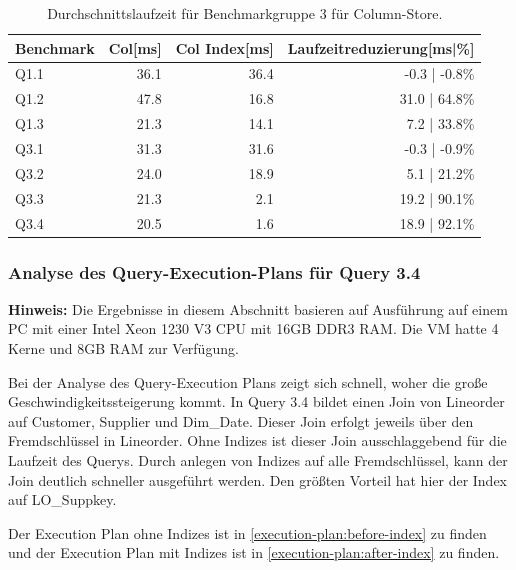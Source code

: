 \begin{table}[H]
    \centering
    \begin{tabularx}{13cm}{lrrr}
        \toprule
        Benchmark           & Col[ms]       & Col Index[ms] & Laufzeitreduzierung[ms|\%]   \\
        \toprule
        Q1.1                & 36.1          & 36.4          & -0.3 | -0.8\%                \\
        Q1.2                & 47.8          & 16.8          & 31.0 | 64.8\%                 \\
        Q1.3                & 21.3          & 14.1          & 7.2 | 33.8\%                \\
        Q3.1                & 31.3          & 31.6          & -0.3 | -0.9\%                \\
        Q3.2                & 24.0          & 18.9          & 5.1 | 21.2\%                 \\
        Q3.3                & 21.3          & 2.1           & 19.2 | 90.1\%                \\
        Q3.4                & 20.5          & 1.6           & 18.9 | 92.1\%                \\
        \bottomrule
    \end{tabularx}
\caption{Durchschnittslaufzeit für Benchmarkgruppe 3 für Column-Store.}
\end{table}

\subsubsection{Analyse des Query-Execution-Plans für Query 3.4}
\textbf{Hinweis:} Die Ergebnisse in diesem Abschnitt basieren auf Ausführung auf einem PC mit einer Intel Xeon 1230 V3 CPU mit 16GB DDR3 RAM. Die VM hatte 4 Kerne und 8GB RAM zur Verfügung.

Bei der Analyse des Query-Execution Plans zeigt sich schnell,
woher die große Geschwindigkeitssteigerung kommt.
In Query 3.4 bildet einen Join von Lineorder auf Customer,
Supplier und Dim\_Date. 
Dieser Join erfolgt jeweils über den Fremdschlüssel in Lineorder.
Ohne Indizes ist dieser Join ausschlaggebend für die Laufzeit des Querys.
Durch anlegen von Indizes auf alle Fremdschlüssel,
kann der Join deutlich schneller ausgeführt werden.
Den größten Vorteil hat hier der Index auf LO\_Suppkey.

Der Execution Plan ohne Indizes ist in \autoref{execution-plan:before-index}
zu finden und der Execution Plan mit Indizes ist in \autoref{execution-plan:after-index} zu finden.

